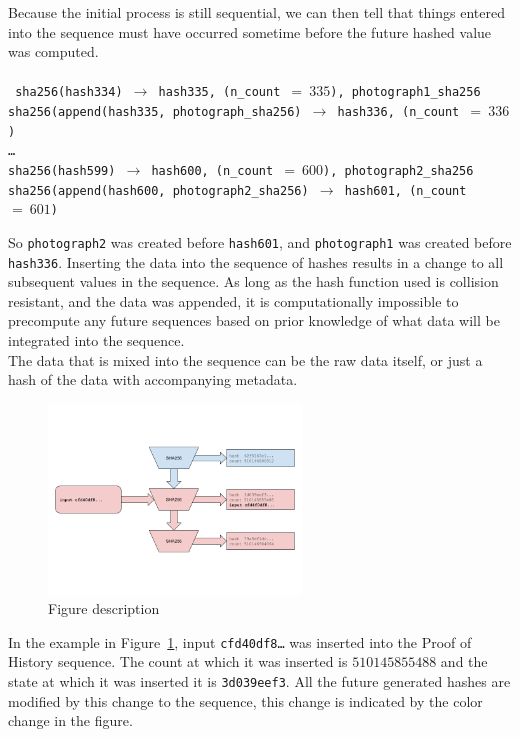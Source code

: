 \documentclass[12pt]{article}
\begin{document}
Because the initial process is still sequential, we can then tell that things entered into the sequence must have occurred sometime before the future hashed value was computed.\\\\\noindent
\texttt{
sha256(hash334) $\rightarrow$ hash335, (n\_count $=~335$), photograph1\_sha256\\
sha256(append(hash335, photograph\_sha256) $\rightarrow$ hash336,
(n\_count $=~336$)\\
\ldots\\
sha256(hash599) $\rightarrow$ hash600, (n\_count $=~600$), photograph2\_sha256
sha256(append(hash600, photograph2\_sha256) $\rightarrow$ hash601,
(n\_count $=~601$)\\
}

So \texttt{photograph2} was created before \texttt{hash601}, and
\texttt{photograph1} was created before \texttt{hash336}. Inserting the data into the sequence of hashes results in a change to all subsequent values in the sequence. As long as the hash function used is collision resistant, and the data was appended, it is computationally impossible to precompute any future sequences based on prior knowledge of what data will be integrated into the sequence.\\

The data that is mixed into the sequence can be the raw data itself, or just a hash of the data with accompanying metadata.\\

\begin{figure}
  \begin{center}
    \centering
    \includegraphics[width=0.6\textwidth]{figures/fig_3.png}
    \caption[Fig 3]{Figure description \label{fig:poh_insert}}
  \end{center}
  \end{figure}

  In the example in Figure~\ref{fig:poh_insert}, input \texttt{cfd40df8\ldots} was inserted into the Proof of History sequence. The count at which it was inserted is $510145855488$ and the state at which it was inserted it is \texttt{3d039eef3}.  All the future generated hashes are modified by this change to the sequence, this change is indicated by the color change in the figure.\\
\end{document}
